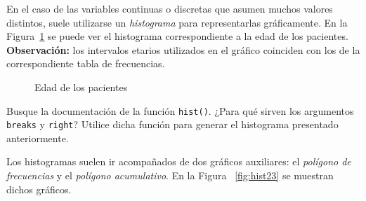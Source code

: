 \documentclass{prob}
\begin{document}
	\begin{problema}
	En el caso de las variables continuas o discretas que asumen muchos valores distintos, suele utilizarse un \textit{histograma} para representarlas gráficamente. En la Figura~\ref{fig:hist} se puede ver el histograma correspondiente a la edad de los pacientes. \\
	\textbf{Observación:} los intervalos etarios utilizados en el gráfico coinciden con los de la correspondiente tabla de frecuencias.
\begin{figure}[!ht]
    \centering
    
    \caption{Edad de los pacientes}
    \label{fig:hist}
\end{figure}		
	
	\begin{parte}
	Busque la documentación de la función \texttt{hist()}. ¿Para qué sirven los argumentos \texttt{breaks} y \texttt{right}? Utilice dicha función para generar el histograma presentado anteriormente.\\
	
	\noindent{}
	\end{parte}	
	
	\begin{parte}
	Los histogramas suelen ir acompañados de dos gráficos auxiliares: el \textit{polígono de frecuencias} y el \textit{polígono acumulativo}. En la Figura ~\ref{fig:hist23} se muestran dichos gráficos.


\end{parte}
\end{problema}
\end{document}
